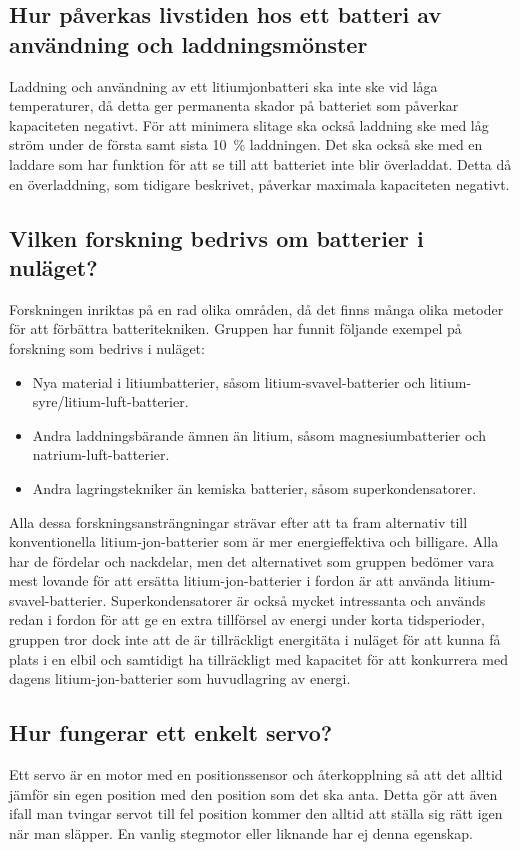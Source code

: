 \documentclass[a4paper,12pt]{article}
\begin{document}
\subsection{Hur påverkas livstiden hos ett batteri av användning och laddningsmönster}
Laddning och användning av ett litiumjonbatteri ska inte ske vid låga temperaturer, då detta ger permanenta skador på batteriet som påverkar kapaciteten negativt. För att minimera slitage ska också laddning ske med låg ström under de första samt sista 10~\% laddningen. Det ska också ske med en laddare som har funktion för att se till att batteriet inte blir överladdat. Detta då en överladdning, som tidigare beskrivet, påverkar maximala kapaciteten negativt.

\subsection{Vilken forskning bedrivs om batterier i nuläget?}
Forskningen inriktas på en rad olika områden, då det finns många olika metoder för att förbättra batteritekniken. Gruppen har funnit följande exempel på forskning som bedrivs i nuläget:
\begin{itemize}
\item Nya material i litiumbatterier, såsom litium-svavel-batterier och litium-syre/litium-luft-batterier.
\item Andra laddningsbärande ämnen än litium, såsom magnesiumbatterier och natrium-luft-batterier.
\item Andra lagringstekniker än kemiska batterier, såsom superkondensatorer.
\end{itemize}
Alla dessa forskningsansträngningar strävar efter att ta fram alternativ till konventionella litium-jon-batterier som är mer energieffektiva och billigare. Alla har de fördelar och nackdelar, men det alternativet som gruppen bedömer vara mest lovande för att ersätta litium-jon-batterier i fordon är att använda litium-svavel-batterier. Superkondensatorer är också mycket intressanta och används redan i fordon för att ge en extra tillförsel av energi under korta tidsperioder, gruppen tror dock inte att de är tillräckligt energitäta i nuläget för att kunna få plats i en elbil och samtidigt ha tillräckligt med kapacitet för att konkurrera med dagens litium-jon-batterier som huvudlagring av energi. 

\subsection{Hur fungerar ett enkelt servo?}
Ett servo är en motor med en positionssensor och återkopplning så att det alltid jämför sin egen position med den position som det ska anta. Detta gör att även ifall man tvingar servot till fel position kommer den alltid att ställa sig rätt igen när man släpper. En vanlig stegmotor eller liknande har ej denna egenskap.
\end{document}
